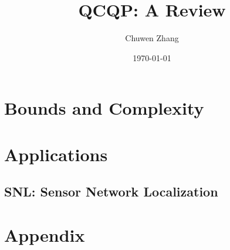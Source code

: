 
\title{QCQP: A Review}
\author{Chuwen Zhang}
\date{\today}


\usepackage{subfiles}
\usepackage{graphicx} 
\usepackage{subfiles} 
\usepackage{subfig}
\usepackage[table]{xcolor}
\usepackage[font=small,labelfont=bf]{caption}

\maketitle
{
    \setcounter{tocdepth}{3}
    \tableofcontents
}
\section{Bounds and Complexity}
\section{Applications}
\subsection{SNL: Sensor Network Localization }

\section*{Appendix}\label{sec:appendix}



